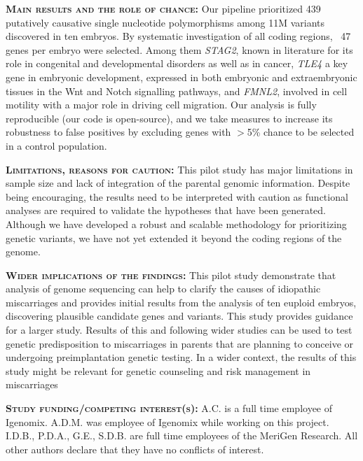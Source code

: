 \textbf{\textsc{Main results and the role of chance:}} 
Our pipeline prioritized 439 putatively causative single nucleotide polymorphisms among 11M variants discovered in ten embryos. By systematic investigation of all coding regions, ~47 genes per embryo were selected. Among them \textit{STAG2}, known in literature for its role in congenital and developmental disorders as well as in cancer, \textit{TLE4} a key gene in embryonic development, expressed in both embryonic and extraembryonic tissues in the Wnt and Notch signalling pathways, and \textit{FMNL2}, involved in cell motility with a major role in driving cell migration. Our analysis is fully reproducible (our code is open-source), and we take measures to increase its robustness to false positives by excluding genes with $>$5\% chance to be selected in a control population.  

\textbf{\textsc{Limitations, reasons for caution:}} 
This pilot study has major limitations in sample size and lack of integration of the parental genomic information. Despite being encouraging, the results need to be interpreted with caution as functional analyses are required to validate the hypotheses that have been generated. Although we have developed a robust and scalable methodology for prioritizing genetic variants, we have not yet extended it beyond the coding regions of the genome.

\textbf{\textsc{Wider implications of the findings:}} 
This pilot study demonstrate that analysis of genome sequencing can help to clarify the causes of idiopathic miscarriages and provides initial results from the analysis of ten euploid embryos, discovering plausible candidate genes and variants. This study provides guidance for a larger study. Results of this and following wider studies can be used to test genetic predisposition to miscarriages in parents that are planning to conceive or undergoing preimplantation genetic testing. In a wider context, the results of this study might be relevant for genetic counseling and risk management in miscarriages

\textbf{\textsc{Study funding/competing interest(s):}} %
A.C. is a full time employee of Igenomix. A.D.M. was employee of Igenomix while working on this project. I.D.B., P.D.A., G.E., S.D.B. are full time employees of the MeriGen Research. All other authors declare that they have no conflicts of interest.

